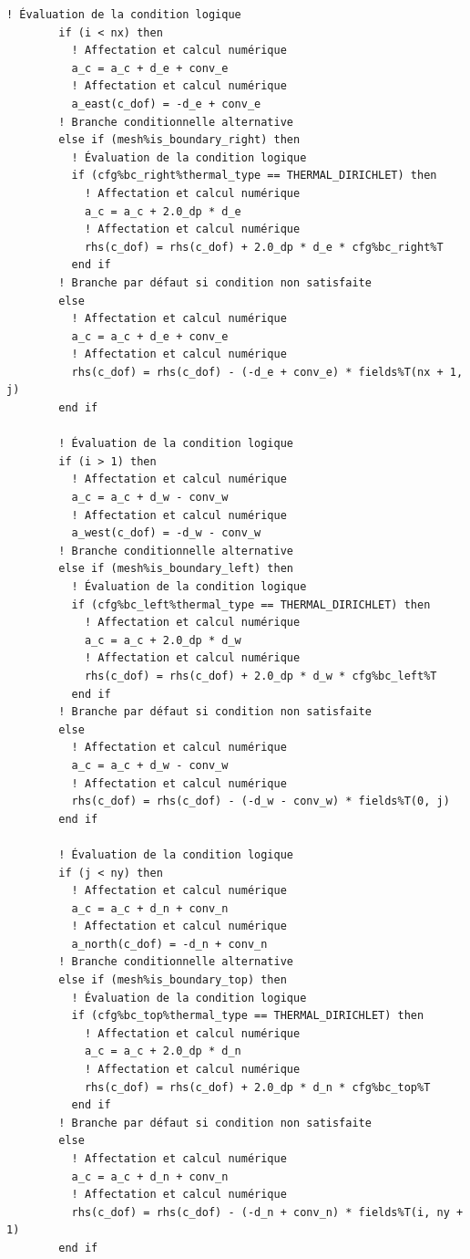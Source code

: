 \documentclass[10pt,a4paper,oneside]{book}
\begin{document}
\begin{lstlisting}[language={[95]Fortran}]
        ! Évaluation de la condition logique
        if (i < nx) then
          ! Affectation et calcul numérique
          a_c = a_c + d_e + conv_e
          ! Affectation et calcul numérique
          a_east(c_dof) = -d_e + conv_e
        ! Branche conditionnelle alternative
        else if (mesh%is_boundary_right) then
          ! Évaluation de la condition logique
          if (cfg%bc_right%thermal_type == THERMAL_DIRICHLET) then
            ! Affectation et calcul numérique
            a_c = a_c + 2.0_dp * d_e
            ! Affectation et calcul numérique
            rhs(c_dof) = rhs(c_dof) + 2.0_dp * d_e * cfg%bc_right%T
          end if
        ! Branche par défaut si condition non satisfaite
        else
          ! Affectation et calcul numérique
          a_c = a_c + d_e + conv_e
          ! Affectation et calcul numérique
          rhs(c_dof) = rhs(c_dof) - (-d_e + conv_e) * fields%T(nx + 1, j)
        end if

        ! Évaluation de la condition logique
        if (i > 1) then
          ! Affectation et calcul numérique
          a_c = a_c + d_w - conv_w
          ! Affectation et calcul numérique
          a_west(c_dof) = -d_w - conv_w
        ! Branche conditionnelle alternative
        else if (mesh%is_boundary_left) then
          ! Évaluation de la condition logique
          if (cfg%bc_left%thermal_type == THERMAL_DIRICHLET) then
            ! Affectation et calcul numérique
            a_c = a_c + 2.0_dp * d_w
            ! Affectation et calcul numérique
            rhs(c_dof) = rhs(c_dof) + 2.0_dp * d_w * cfg%bc_left%T
          end if
        ! Branche par défaut si condition non satisfaite
        else
          ! Affectation et calcul numérique
          a_c = a_c + d_w - conv_w
          ! Affectation et calcul numérique
          rhs(c_dof) = rhs(c_dof) - (-d_w - conv_w) * fields%T(0, j)
        end if

        ! Évaluation de la condition logique
        if (j < ny) then
          ! Affectation et calcul numérique
          a_c = a_c + d_n + conv_n
          ! Affectation et calcul numérique
          a_north(c_dof) = -d_n + conv_n
        ! Branche conditionnelle alternative
        else if (mesh%is_boundary_top) then
          ! Évaluation de la condition logique
          if (cfg%bc_top%thermal_type == THERMAL_DIRICHLET) then
            ! Affectation et calcul numérique
            a_c = a_c + 2.0_dp * d_n
            ! Affectation et calcul numérique
            rhs(c_dof) = rhs(c_dof) + 2.0_dp * d_n * cfg%bc_top%T
          end if
        ! Branche par défaut si condition non satisfaite
        else
          ! Affectation et calcul numérique
          a_c = a_c + d_n + conv_n
          ! Affectation et calcul numérique
          rhs(c_dof) = rhs(c_dof) - (-d_n + conv_n) * fields%T(i, ny + 1)
        end if


\end{lstlisting}
\end{document}

